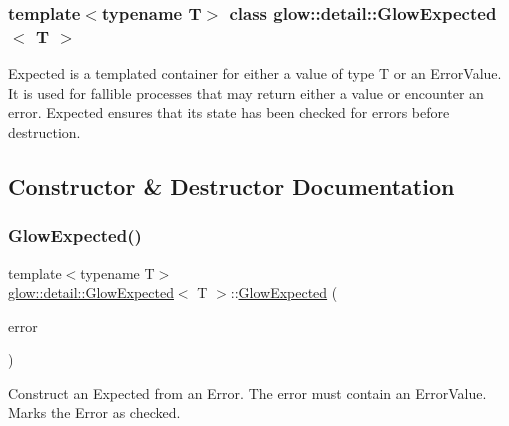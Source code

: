 \subsubsection*{template$<$typename T$>$\newline
class glow\+::detail\+::\+Glow\+Expected$<$ T $>$}

Expected is a templated container for either a value of type T or an Error\+Value. It is used for fallible processes that may return either a value or encounter an error. Expected ensures that its state has been checked for errors before destruction. 

\subsection{Constructor \& Destructor Documentation}
\mbox{\label{classglow_1_1detail_1_1_glow_expected_aa21ba9bdd7c064878fd769bee6216712}} 
\subsubsection{\texorpdfstring{Glow\+Expected()}{GlowExpected()}\hspace{0.1cm}{\footnotesize\ttfamily [1/3]}}
{\footnotesize\ttfamily template$<$typename T$>$ \\
\hyperlink{classglow_1_1detail_1_1_glow_expected}{glow\+::detail\+::\+Glow\+Expected}$<$ T $>$\+::\hyperlink{classglow_1_1detail_1_1_glow_expected}{Glow\+Expected} (\begin{DoxyParamCaption}\item[{\hyperlink{classglow_1_1detail_1_1_glow_error}{Glow\+Error}}]{error }\end{DoxyParamCaption})\hspace{0.3cm}{\ttfamily [inline]}}

Construct an Expected from an Error. The error must contain an Error\+Value. Marks the Error as checked. \mbox{\label{classglow_1_1detail_1_1_glow_expected_af574842af6b0354d6a73eaafd4a9eeed}} 
